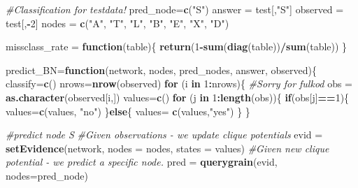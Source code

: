 \documentclass[]{article}
\newenvironment{Shaded}{\begin{snugshade}}{\end{snugshade}}
\newcommand{\CommentTok}[1]{\textcolor[rgb]{0.56,0.35,0.01}{\textit{#1}}}
\newcommand{\ControlFlowTok}[1]{\textcolor[rgb]{0.13,0.29,0.53}{\textbf{#1}}}
\newcommand{\DataTypeTok}[1]{\textcolor[rgb]{0.13,0.29,0.53}{#1}}
\newcommand{\DecValTok}[1]{\textcolor[rgb]{0.00,0.00,0.81}{#1}}
\newcommand{\KeywordTok}[1]{\textcolor[rgb]{0.13,0.29,0.53}{\textbf{#1}}}
\newcommand{\NormalTok}[1]{#1}
\newcommand{\OperatorTok}[1]{\textcolor[rgb]{0.81,0.36,0.00}{\textbf{#1}}}
\newcommand{\StringTok}[1]{\textcolor[rgb]{0.31,0.60,0.02}{#1}}
\begin{document}
\begin{Shaded}
\begin{Highlighting}[]
\CommentTok{#Classification for testdata!}
\NormalTok{pred_node=}\KeywordTok{c}\NormalTok{(}\StringTok{"S"}\NormalTok{)}
\NormalTok{answer =}\StringTok{ }\NormalTok{test[,}\StringTok{"S"}\NormalTok{]}
\NormalTok{observed =}\StringTok{ }\NormalTok{test[,}\OperatorTok{-}\DecValTok{2}\NormalTok{]}
\NormalTok{nodes =}\StringTok{ }\KeywordTok{c}\NormalTok{(}\StringTok{"A"}\NormalTok{, }\StringTok{"T"}\NormalTok{, }\StringTok{"L"}\NormalTok{, }\StringTok{"B"}\NormalTok{, }\StringTok{"E"}\NormalTok{, }\StringTok{"X"}\NormalTok{, }\StringTok{"D"}\NormalTok{)}

\NormalTok{missclass_rate =}\StringTok{ }\ControlFlowTok{function}\NormalTok{(table)\{}
  \KeywordTok{return}\NormalTok{(}\DecValTok{1}\OperatorTok{-}\KeywordTok{sum}\NormalTok{(}\KeywordTok{diag}\NormalTok{(table))}\OperatorTok{/}\KeywordTok{sum}\NormalTok{(table))}
\NormalTok{\}}

\NormalTok{predict_BN=}\ControlFlowTok{function}\NormalTok{(network, nodes, pred_nodes, answer, observed)\{}
\NormalTok{  classify=}\KeywordTok{c}\NormalTok{()}
\NormalTok{  nrows=}\KeywordTok{nrow}\NormalTok{(observed)}
  \ControlFlowTok{for}\NormalTok{ (i }\ControlFlowTok{in} \DecValTok{1}\OperatorTok{:}\NormalTok{nrows)\{}
    \CommentTok{#Sorry for fulkod}
\NormalTok{    obs =}\StringTok{ }\KeywordTok{as.character}\NormalTok{(observed[i,])}
\NormalTok{    values=}\KeywordTok{c}\NormalTok{()}
    \ControlFlowTok{for}\NormalTok{ (j }\ControlFlowTok{in} \DecValTok{1}\OperatorTok{:}\KeywordTok{length}\NormalTok{(obs))\{}
      \ControlFlowTok{if}\NormalTok{(obs[j]}\OperatorTok{==}\DecValTok{1}\NormalTok{)\{}
\NormalTok{        values=}\KeywordTok{c}\NormalTok{(values, }\StringTok{"no"}\NormalTok{)}
\NormalTok{      \}}\ControlFlowTok{else}\NormalTok{\{}
\NormalTok{        values=}\StringTok{ }\KeywordTok{c}\NormalTok{(values,}\StringTok{"yes"}\NormalTok{)}
\NormalTok{      \}}
\NormalTok{    \}}
    
    \CommentTok{#predict node S}
    \CommentTok{#Given observations - we update clique potentials}
\NormalTok{    evid =}\StringTok{ }\KeywordTok{setEvidence}\NormalTok{(network, }\DataTypeTok{nodes =}\NormalTok{ nodes, }\DataTypeTok{states =}\NormalTok{ values) }
    \CommentTok{#Given new clique potential - we predict a specific node. }
\NormalTok{    pred =}\StringTok{ }\KeywordTok{querygrain}\NormalTok{(evid, }\DataTypeTok{nodes=}\NormalTok{pred_node)}
    

\end{Highlighting}
\end{Shaded}
\end{document}
